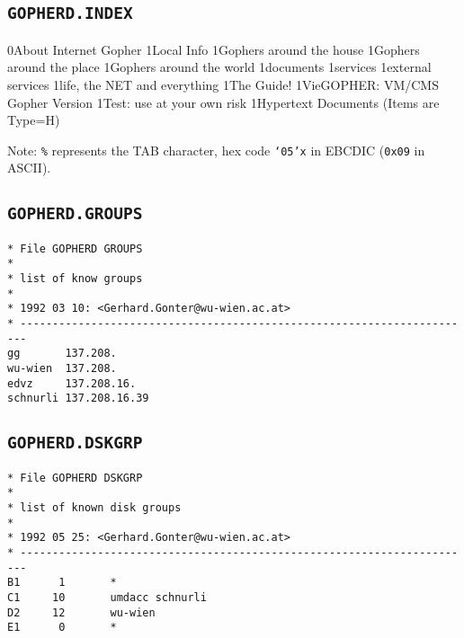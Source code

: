 \begin{appendix}
\subsection{\tt GOPHERD.INDEX}
\begin{vsmtt}
\begin{verbatim*}
0About Internet Gopher%about%awiwuw11.wu-wien.ac.at%70
1Local Info%local%awiwuw11.wu-wien.ac.at%70
1Gophers around the house%wu%awiwuw11.wu-wien.ac.at%70
1Gophers around the place%austria%awiwuw11.wu-wien.ac.at%70
1Gophers around the world%others%awiwuw11.wu-wien.ac.at%70
1documents%documents%awiwuw11.wu-wien.ac.at%70
1services%services%awiwuw11.wu-wien.ac.at%70
1external services%1/.exser.ind%olymp.wu-wien.ac.at%70
1life, the NET and everything%net info%awiwuw11.wu-wien.ac.at%70
1The Guide!%1/.guide.ind%olymp.wu-wien.ac.at%70
1VieGOPHER: VM/CMS Gopher Version%VM Gopher%awiwuw11.wu-wien.ac.at%70
1Test: use at your own risk%test%awiwuw11.wu-wien.ac.at%70
1Hypertext Documents  (Items are Type=H)%1/.hyx%olymp.wu-wien.ac.at%70
\end{verbatim*}
\end{vsmtt}

\noindent Note: {\tt \%} represents the TAB character, hex code
{\tt `05'x} in EBCDIC ({\tt 0x09} in ASCII).




\subsection{\tt GOPHERD.GROUPS}
\begin{small}
\begin{verbatim}
* File GOPHERD GROUPS
*
* list of know groups
*
* 1992 03 10: <Gerhard.Gonter@wu-wien.ac.at>
* -----------------------------------------------------------------------
gg       137.208.
wu-wien  137.208.
edvz     137.208.16.
schnurli 137.208.16.39
\end{verbatim}
\end{small}



\subsection{\tt GOPHERD.DSKGRP}\label{example GOPHERD.DSKGRP}
\begin{small}
\begin{verbatim}
* File GOPHERD DSKGRP
*
* list of known disk groups
*
* 1992 05 25: <Gerhard.Gonter@wu-wien.ac.at>
* -----------------------------------------------------------------------
B1      1       *
C1     10       umdacc schnurli
D2     12       wu-wien
E1      0       *
\end{verbatim}
\end{small}


\end{appendix}
